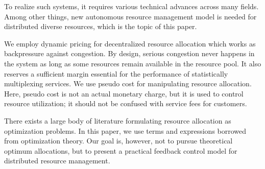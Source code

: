 To realize such systems, it requires various technical advances across
many fields.  Among other things, new autonomous resource management
model is needed for distributed diverse resources,
which is the topic of this paper.


We employ dynamic pricing for decentralized resource
allocation which works as backpressure against congestion.
By design, serious congestion never happens in the system as long as
some resources remain available in the resource pool.
It also reserves a sufficient margin essential for the performance of
statistically multiplexing services.
We use pseudo cost for manipulating resource allocation.
Here, pseudo cost is not an actual monetary charge, but it is used to
control resource utilization; it should not be confused with service
fees for customers.

There exists a large body of literature formulating resource allocation
as optimization problems.
In this paper, we use terms and expressions borrowed from optimization
theory. Our goal is, however, not to pursue theoretical optimum
allocations, but to present a practical feedback control model for
distributed resource management.


